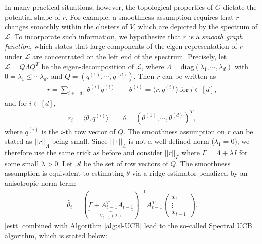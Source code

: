 \documentclass[letterpaper,11pt,openright,openany]{book}
\numberwithin{equation}{section}
\theoremstyle{plain}
\theoremstyle{definition}
\def\t{{\theta}}
\begin{document}
In many practical situations, however, the topological properties of $G$ dictate the potential shape of $r$. 
For example, a smoothness assumption requires that $r$ changes smoothly within the clusters of $V$, which are depicted by the spectrum of $\mathcal L$.  
To incorporate such information, we hypothesize that $r$ is a \emph{smooth graph function}, which states that large components of the eigen-representation of $r$ under $\mathcal L$ are concentrated on the left end of the spectrum. 
Precisely, let $\mathcal L = Q\Lambda Q^T$ be the eigen-decomposition of $\mathcal L$, where $\Lambda = \text{diag}(\lambda_1, \cdots, \lambda_d)$ with $0=\lambda_1\leq\cdots\lambda_d$, and $Q = (q^{(1)}, \cdots,  q^{(d)})$. Then $r$ can be written as 
\begin{align*}
r =\sum_{i\in [d]}\t^{(i)}q^{(i)}\ \ \ \ \ \ \ \ \ \t^{(i)} = \langle r, q^{(i)}\rangle\ \text{for}\ i\in [d],
\end{align*}
and for $i\in [d]$,
\begin{align*}
r_i = \langle\t, \bar{q}^{(i)}\rangle\ \ \ \ \ \ \ \ \ \t = (\t^{(1)},\cdots, \t^{(d)})^T,
\end{align*}
where $\bar{q}^{(i)}$ is the $i$-th row vector of $Q$. 
The smoothness assumption on $r$ can be stated as $||r||_{\Lambda}$ being small. 
Since $||\cdot||_\Lambda$ is not a well-defined norm ($\lambda_1=0$), we therefore use the same trick as before and consider $||r||_\Gamma$ where $\Gamma = \Lambda +\lambda I$ for some small $\lambda>0$. 
Let $\mathcal A$ be the set of row vectors of $Q$. The smoothness assumption is equivalent to estimating $\t$ via a ridge estimator penalized by an anisotropic norm term:
\begin{align}\label{estt}
\hat{\t}_t = (\underbrace{\Gamma +A^T_{t-1}A_{t-1}}_{V_{t-1}(\lambda)})^{-1}A^T_{t-1}\begin{pmatrix}
x_1 \\
\vdots \\
x_{t-1}
\end{pmatrix}.
\end{align}
\eqref{estt} combined with Algorithm \ref{alg:sl-UCB} lead to the so-called Spectral UCB algorithm, which is stated below: 
\end{document}
